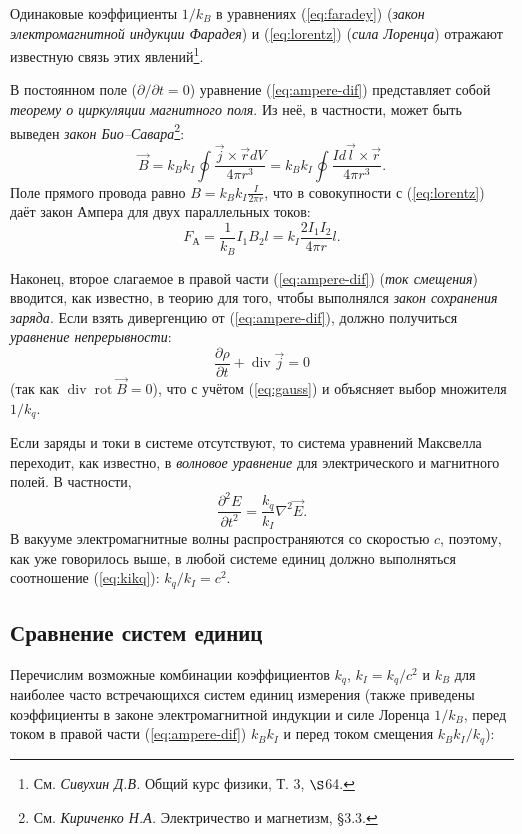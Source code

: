 Одинаковые коэффициенты $1/k_{B}$ в уравнениях (\ref{eq:faradey})
(\emph{закон электромагнитной индукции Фарадея}) и (\ref{eq:lorentz})
(\emph{сила Лоренца}) отражают известную связь этих явлений\footnote{См. \emph{Сивухин Д.В.} Общий курс физики, Т. 3, $\S$64.}.

В постоянном поле ($\partial/\partial t=0$) уравнение (\ref{eq:ampere-dif})
представляет собой \emph{теорему о циркуляции магнитного поля}. Из
неё, в частности, может быть выведен \emph{закон Био--Савара}\footnote{См. \emph{Кириченко Н.А.} Электричество и магнетизм, \S3.3.}:
\[
\vec{B}=k_{B}k_{I}\oint\frac{\vec{j}\times\vec{r}dV}{4\pi r^{3}}=k_{B}k_{I}\oint\frac{Id\vec{l}\times\vec{r}}{4\pi r^{3}}.
\]
Поле прямого провода равно $B=k_{B}k_{I}\frac{I}{2\pi r}$, что в
совокупности с (\ref{eq:lorentz}) даёт закон Ампера для двух параллельных
токов:
\[
F_{\text{А}}=\frac{1}{k_{B}}I_{1}B_{2}l=k_{I}\frac{2I_{1}I_{2}}{4\pi r}l.
\]

Наконец, второе слагаемое в правой части (\ref{eq:ampere-dif}) (\emph{ток
смещения}) вводится, как известно, в теорию для того, чтобы выполнялся
\emph{закон сохранения заряда}. Если взять дивергенцию от (\ref{eq:ampere-dif}),
должно получиться \emph{уравнение непрерывности}:
\[
\frac{\partial\rho}{\partial t}+\mathop{\mathrm{div}}\vec{j}=0
\]
(так как $\mathop{\mathrm{div}}\mathop{\mathrm{rot}}\vec{B}=0$),
что с учётом (\ref{eq:gauss}) и объясняет выбор множителя $1/k_{q}$.

Если заряды и токи в системе отсутствуют, то система уравнений Максвелла
переходит, как известно, в \emph{волновое уравнение} для электрического
и магнитного полей. В частности,
\[
\frac{\partial^{2}E}{\partial t^{2}}=\frac{k_{q}}{k_{I}}\nabla^{2}\vec{E}.
\]
В вакууме электромагнитные волны распространяются со скоростью $c$,
поэтому, как уже говорилось выше, в любой системе единиц должно выполняться
соотношение (\ref{eq:kikq}): $k_{q}/k_{I}=c^{2}$.

\subsection*{Сравнение систем единиц}

Перечислим возможные комбинации коэффициентов $k_{q}$, $k_{I}=k_{q}/c^{2}$
и $k_{B}$ для наиболее часто встречающихся систем единиц измерения
(также приведены коэффициенты в законе электромагнитной индукции и
силе Лоренца $1/k_{B}$, перед током в правой части (\ref{eq:ampere-dif})
$k_{B}k_{I}$ и перед током смещения $k_{B}k_{I}/k_{q}$):

